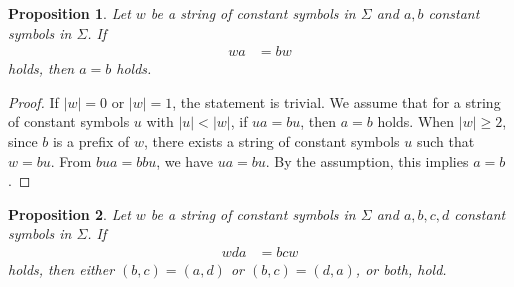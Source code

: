 
\newtheorem{prop}{Proposition}
\newcommand{\pair}[2]{(#1,#2)}
\newcommand{\TheConditionA}{$b \not\in \{a,d\}$ and $c \not\in \{a,d\}$}
\newcommand{\TheConditionB}{$b \not= d \mbox{~and~}c \not\in \{a,d\}$}
\newcommand{\TheConditionBsub}{$c \not\in \{a,d\}$}
\newcommand{\TheConditionC}{$b \not\in \{a, d\} \mbox{~and~} c \not= a$}

\begin{prop}\label{prop:repstring_origin}
  Let $w$ be a string of constant symbols in $\Sigma$ and $a,b$ constant symbols in $\Sigma$.
  If
  \begin{align}
  wa & = bw\label{eq:repstring_origin}
  \end{align}
  holds, then $a = b$ holds.
\end{prop}

\begin{proof}
If $|w|=0$ or $|w|=1$, the statement is trivial. We assume that for a string of constant symbols $u$ with $|u| < |w|$, if $ua = bu$, then $a = b$ holds. When $|w| \geq 2$, since $b$ is a prefix of $w$, there exists a string of constant symbols $u$ such that $w = bu$. From $bua = bbu$, we have $ua = bu$. By the assumption, this implies $a = b$.  
\end{proof}

\begin{prop}\label{prop:repstring_base}
Let $w$ be a string of constant symbols in $\Sigma$ and $a,b,c,d$ constant symbols in $\Sigma$.
If
\begin{align}
wda & = bcw\label{eq:repstring_base}
\end{align}
holds, then either $\pair{b}{c} = \pair{a}{d}$ or $\pair{b}{c} = \pair{d}{a}$, or both, hold.
\end{prop}

